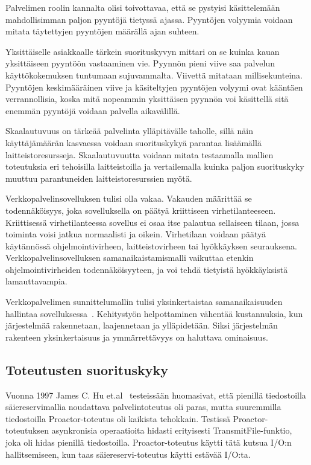 \documentclass[finnish]{tktltiki2}
\theoremstyle{definition}
\theoremstyle{remark}
\begin{document}
Palvelimen roolin kannalta olisi toivottavaa, että
se pystyisi käsittelemään mahdollisimman paljon pyyntöjä
tietyssä ajassa. Pyyntöjen volyymia voidaan
mitata täytettyjen pyyntöjen määrällä ajan suhteen.

Yksittäiselle asiakkaalle tärkein suorituskyvyn mittari on se kuinka kauan
yksittäiseen pyyntöön vastaaminen vie.
Pyynnön pieni viive saa
palvelun käyttökokemuksen tuntumaan sujuvammalta.
Viivettä mitataan millisekunteina.
Pyyntöjen keskimääräinen viive ja käsiteltyjen pyyntöjen
volyymi ovat kääntäen verrannollisia, koska
mitä nopeammin yksittäisen pyynnön voi käsittellä sitä
enemmän pyyntöjä voidaan palvella aikavälillä.

Skaalautuvuus on tärkeää palvelinta ylläpitävälle taholle, sillä
näin käyttäjämäärän kasvaessa voidaan suorituskykyä parantaa
lisäämällä laitteistoresursseja. Skaalautuvuutta voidaan
mitata testaamalla mallien toteutuksia eri tehoisilla laitteistoilla
ja vertailemalla kuinka paljon suorituskyky muuttuu 
parantuneiden laitteistoresurssien myötä.

Verkkopalvelinsovelluksen tulisi
olla vakaa. Vakauden määrittää
se todennäköisyys, joka sovelluksella on
päätyä kriittiseen virhetilanteeseen. Kriittisessä
virhetilanteessa sovellus ei osaa
itse palautua sellaiseen tilaan, jossa
toiminta voisi jatkua normaalisti ja oikein.
Virhetilaan voidaan päätyä käytännössä
ohjelmointivirheen, laitteistovirheen tai hyökkäyksen seurauksena.
Verkkopalvelinsovelluksen samanaikaistamismalli
vaikuttaa etenkin ohjelmointivirheiden todennäköisyyteen,
ja voi tehdä tietyistä hyökkäyksistä lamauttavampia.


Verkkopalvelimen sunnittelumallin tulisi
yksinkertaistaa samanaikaisuuden hallintaa sovelluksessa~\cite{hu_applying_1998}.
Kehitystyön helpottaminen vähentää kustannuksia,
kun järjestelmää rakennetaan, laajennetaan ja ylläpidetään.
Siksi järjestelmän rakenteen yksinkertaisuus ja
ymmärrettävyys on haluttava ominaisuus.

\subsection{Toteutusten suorituskyky}
Vuonna 1997 James C. Hu et.al~\cite{hu_measuring_1997} testeissään huomasivat,
että pienillä tiedostoilla säiereservimallia noudattava palvelintoteutus oli paras,
mutta suuremmilla tiedostoilla Proactor-toteutus oli kaikista tehokkain.
Testissä Proactor-toteutuksen asynkronisia operaatioita hidasti
erityisesti TransmitFile-funktio, joka oli
hidas pienillä tiedostoilla.
Proactor-toteutus käytti tätä kutsua I/O:n hallitsemiseen,
kun taas säiereservi-toteutus käytti estävää I/O:ta.
\end{document}
